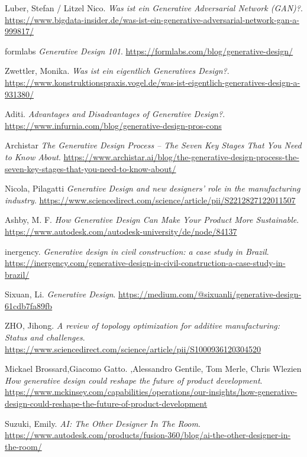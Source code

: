 \begin{thebibliography}{99}
     Luber, Stefan / Litzel Nico. \textit{Was ist ein Generative Adversarial Network (GAN)?}. \url{https://www.bigdata-insider.de/was-ist-ein-generative-adversarial-network-gan-a-999817/}

     formlabs \textit{Generative Design 101}. \url{https://formlabs.com/blog/generative-design/}

     Zwettler, Monika. \textit{Was ist ein eigentlich Generatives Design?}. \url{https://www.konstruktionspraxis.vogel.de/was-ist-eigentlich-generatives-design-a-931380/}

     Aditi. \textit{Advantages and Disadvantages of Generative Design?}. \url{https://www.infurnia.com/blog/generative-design-pros-cons}

     Archistar \textit{The Generative Design Process – The Seven Key Stages That You Need to Know About}. \url{https://www.archistar.ai/blog/the-generative-design-process-the-seven-key-stages-that-you-need-to-know-about/}

     Nicola, Pilagatti \textit{Generative Design and new designers’ role in the manufacturing industry}. \url{https://www.sciencedirect.com/science/article/pii/S2212827122011507}
    
     Ashby, M. F. \textit{How Generative Design Can Make Your Product More Sustainable}. \url{https://www.autodesk.com/autodesk-university/de/node/84137}
    
     inergency. \textit{Generative design in civil construction: a case study in Brazil}. \url{https://inergency.com/generative-design-in-civil-construction-a-case-study-in-brazil/}

     Sixuan, Li. \textit{Generative Design}. \url{    https://medium.com/@sixuanli/generative-design-61cdb7fa89fb}
    
     ZHO, Jihong. \textit{A review of topology optimization for additive manufacturing: Status and challenges}. \url{https://www.sciencedirect.com/science/article/pii/S1000936120304520}

     Mickael Brossard,Giacomo Gatto. ,Alessandro Gentile, Tom Merle, Chris Wlezien \textit{How generative design could reshape the future of product development}. \url{    https://www.mckinsey.com/capabilities/operations/our-insights/how-generative-design-could-reshape-the-future-of-product-development}

     Suzuki, Emily. \textit{AI: The Other Designer In The Room}. \url{https://www.autodesk.com/products/fusion-360/blog/ai-the-other-designer-in-the-room/}


\end{thebibliography}
